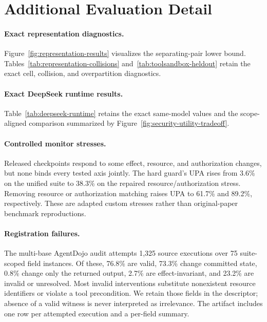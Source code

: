 \section{Additional Evaluation Detail}
\label{app:additional-results}

\paragraph{Exact representation diagnostics.}


Figure~\ref{fig:representation-results} visualizes the separating-pair lower
bound.  Tables~\ref{tab:representation-collisions}
and~\ref{tab:toolsandbox-heldout} retain the exact cell, collision, and
overpartition diagnostics.

\paragraph{Exact DeepSeek runtime results.}

Table~\ref{tab:deepseek-runtime} retains the exact same-model values and the
scope-aligned comparison summarized by
Figure~\ref{fig:security-utility-tradeoff}.

\paragraph{Controlled monitor stresses.}

Released checkpoints respond to some effect, resource, and authorization
changes, but none binds every tested axis jointly.  The hard guard's UPA rises
from 3.6\% on the unified suite to 38.3\% on the repaired resource/authorization
stress.  Removing resource or authorization matching raises UPA to 61.7\% and
89.2\%, respectively.  These are adapted custom stresses rather than
original-paper benchmark reproductions.

\paragraph{Registration failures.}
The multi-base AgentDojo audit attempts 1,325 source executions over 75
suite-scoped field instances.  Of these, 76.8\% are valid, 73.3\% change
committed state, 0.8\% change only the returned output, 2.7\% are
effect-invariant, and 23.2\% are invalid or unresolved.  Most invalid interventions substitute nonexistent resource
identifiers or violate a tool precondition.  We retain those fields in the
descriptor; absence of a valid witness is never interpreted as irrelevance.
The artifact includes one row per attempted execution and a per-field summary.

